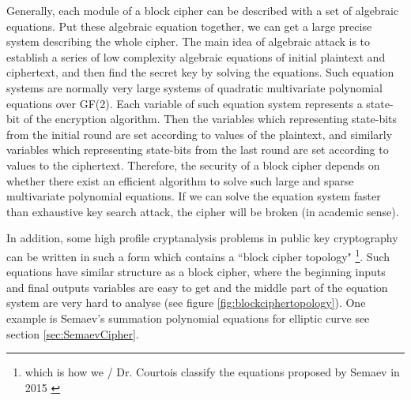 Generally, each module of a block cipher can be described with a set of algebraic equations. Put these algebraic equation together, we can get a large precise system describing the whole cipher. The main idea of algebraic attack is to establish a series of low complexity algebraic equations of initial plaintext and ciphertext, and then find the secret key by solving the equations. Such equation systems are normally very large systems of quadratic multivariate polynomial equations over GF(2). Each variable of such equation system represents a state-bit of the encryption algorithm. Then the variables which representing state-bits from the initial round are set according to values of the plaintext, and similarly variables which representing state-bits from the last round are set according to values to the ciphertext. Therefore, the security of a block cipher depends on whether there exist an efficient algorithm to solve such large and sparse multivariate polynomial equations. If we can solve the equation system faster than exhaustive key search attack, the cipher will be broken (in academic sense).

In addition, some high profile cryptanalysis problems in public key cryptography can be written in such a form which contains a ``block cipher topology" \footnote{which is how we / Dr. Courtois classify the equations proposed by Semaev in 2015 \cite{courtois2002cryptanalysis,CourtoisBlockEnigmaSlides,cryptoeprint:2015:310}}. Such equations have similar structure as a block cipher, where the beginning inputs and final outputs variables are easy to get and the middle part of the equation system are very hard to analyse (see figure \ref{fig:blockciphertopology}). One example is Semaev's summation polynomial equations for elliptic curve \cite{semaev2004summation,cryptoeprint:2015:310} see section \ref{sec:SemaevCipher}.      

